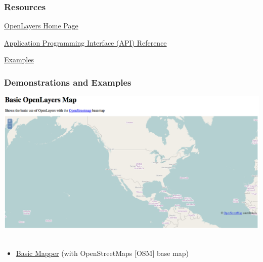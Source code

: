 \documentclass[]{article}
\begin{document}
\subsubsection{Resources}\label{resources}

\href{http://openlayers.org/}{OpenLayers Home Page}

\href{http://dev.openlayers.org/apidocs/files/OpenLayers-js.html}{Application
Programming Interface (API) Reference}

\href{http://openlayers.org/dev/examples/}{Examples}

\subsubsection{Demonstrations and
Examples}\label{demonstrations-and-examples}

\includegraphics{images/OpenLayers_01.jpg}~

\begin{itemize}
\itemsep1pt\parskip0pt
\item
  \href{http://karlbenedict.com/presentations/2014-04-NMGIC/examples/openLayers01_osm.html}{Basic
  Mapper} (with OpenStreetMaps {[}OSM{]} base map)
\end{itemize}
\end{document}
